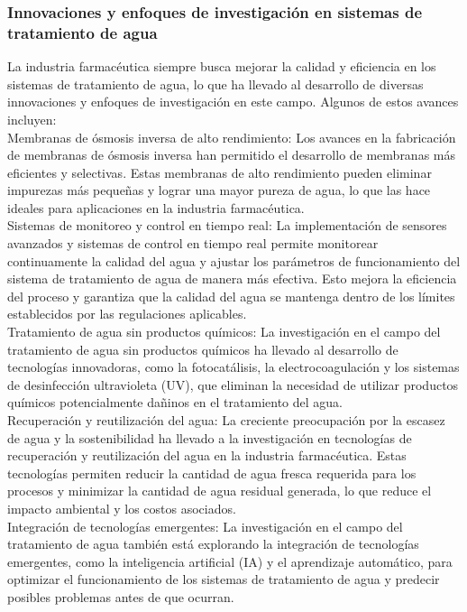 \subsubsection{Innovaciones y enfoques de investigación en sistemas de tratamiento de agua}

La industria farmacéutica siempre busca mejorar la calidad y eficiencia en los sistemas de tratamiento de agua, lo que ha llevado al desarrollo de diversas innovaciones y enfoques de investigación en este campo. Algunos de estos avances incluyen:\\

Membranas de ósmosis inversa de alto rendimiento: Los avances en la fabricación de membranas de ósmosis inversa han permitido el desarrollo de membranas más eficientes y selectivas. Estas membranas de alto rendimiento pueden eliminar impurezas más pequeñas y lograr una mayor pureza de agua, lo que las hace ideales para aplicaciones en la industria farmacéutica.\\

Sistemas de monitoreo y control en tiempo real: La implementación de sensores avanzados y sistemas de control en tiempo real permite monitorear continuamente la calidad del agua y ajustar los parámetros de funcionamiento del sistema de tratamiento de agua de manera más efectiva. Esto mejora la eficiencia del proceso y garantiza que la calidad del agua se mantenga dentro de los límites establecidos por las regulaciones aplicables.\\

Tratamiento de agua sin productos químicos: La investigación en el campo del tratamiento de agua sin productos químicos ha llevado al desarrollo de tecnologías innovadoras, como la fotocatálisis, la electrocoagulación y los sistemas de desinfección ultravioleta (UV), que eliminan la necesidad de utilizar productos químicos potencialmente dañinos en el tratamiento del agua.\\

Recuperación y reutilización del agua: La creciente preocupación por la escasez de agua y la sostenibilidad ha llevado a la investigación en tecnologías de recuperación y reutilización del agua en la industria farmacéutica. Estas tecnologías permiten reducir la cantidad de agua fresca requerida para los procesos y minimizar la cantidad de agua residual generada, lo que reduce el impacto ambiental y los costos asociados.\\

Integración de tecnologías emergentes: La investigación en el campo del tratamiento de agua también está explorando la integración de tecnologías emergentes, como la inteligencia artificial (IA) y el aprendizaje automático, para optimizar el funcionamiento de los sistemas de tratamiento de agua y predecir posibles problemas antes de que ocurran.\\

